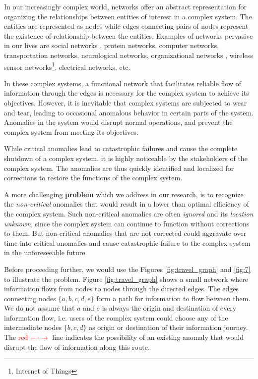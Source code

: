 \documentclass{sig-alternate}
\begin{document}

In our increasingly complex world, networks offer an abstract representation for organizing the relationships between entities of interest in a complex system. The entities are represented as nodes while edges connecting pairs of nodes represent the existence of relationship between the entities. Examples of networks pervasive in our lives are social networks \cite{Wu2004}, protein networks, computer networks, transportation networks, neurological networks, organizational networks \cite{Mihm2010}, wireless sensor networks\footnote{Internet of Things}, electrical networks, etc. 

In these complex systems, a functional network that facilitates reliable flow of information through the edges is necessary for the complex system to achieve its objectives. However, it is inevitable that complex systems are subjected to wear and tear, leading to occasional anomalous behavior in certain parts of the system. Anomalies in the system would disrupt normal operations, and prevent the complex system from meeting its objectives.

While critical anomalies lead to catastrophic failures and cause the complete shutdown of a complex system, it is highly noticeable by the stakeholders of the complex system. The anomalies are thus quickly identified and localized for corrections to restore the functions of the complex system.

A more challenging \textbf{problem} which we address in our research, is to recognize the \emph{non-critical} anomalies that would result in a lower than optimal efficiency of the complex system. Such non-critical anomalies are often \emph{ignored} and its \emph{location unknown}, since the complex system can continue to function without corrections to them. But non-critical anomalies that are not corrected could aggravate over time into critical anomalies and cause catastrophic failure to the complex system in the unforeseeable future. 

Before proceeding further, we would use the Figures \ref{fig:travel_graph} and \ref{fig:7} to illustrate the problem. Figure \ref{fig:travel_graph} shows a small network where information flows from nodes to nodes through the directed edges. The edges connecting nodes $\{a, b, c, d, e\}$ form a path for information to flow between them. We do not assume that $a$ and $e$ is always the origin and destination of every information flow, i.e. users of the complex system could choose any of the intermediate nodes $\{b, c, d\}$ as origin or destination of their information journey. The \textcolor{red}{red $- ~ \cdot \rightarrow$} line indicates the possibility of an existing anomaly that would disrupt the flow of information along this route.
\end{document}
